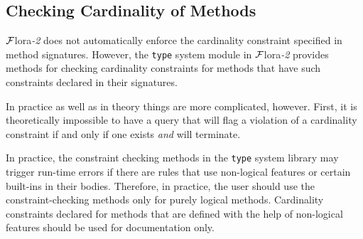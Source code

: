 \documentclass[11pt]{article}
\newcommand{\FLORA}{{\mbox{\sc ${\cal F}${lora}\rm\emph{-2}}}\xspace}
\begin{document}
\subsection{Checking Cardinality of Methods}\label{sec-cardinality}

\FLORA does not automatically enforce the cardinality constraint specified
in method signatures.  However, the {\tt type} system module in \FLORA
provides methods for checking cardinality
constraints for methods that have such constraints declared in their
signatures.

In practice as well as in theory things are more complicated, however.
First, it is theoretically impossible to have a query that will flag a
violation of a cardinality constraint if and only if one exists \emph{and}
will terminate.

In practice, the constraint checking methods
in the {\tt type} system library may trigger run-time
errors if there are rules that use non-logical features or certain
built-ins
in their bodies.  Therefore, in practice, the user should use the
constraint-checking methods only for purely logical methods. Cardinality
constraints declared for methods that are defined with the help of
non-logical features should be used for documentation only.
\end{document}
